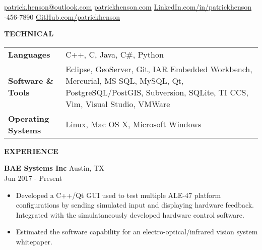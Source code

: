 \documentclass[10pt]{article}
\newcommand{\verticalspace}{\vspace{2.0mm}}
\newcommand{\horizontalrule}{\noindent\hrulefill}
\newcommand{\heading}{\noindent\Large\bf} %
\newcommand{\headingspace}{\vspace{3.5mm}}
\begin{document}
\renewcommand\familydefault{\sfdefault}



\hfill

\vspace{-2mm}
\horizontalrule

\noindent 
\href{mailto:fullname@email.com}{patrick.henson@outlook.com}
\hfill
\href{https://patrickhenson.com}{patrickhenson.com}
\hfill
\href{linkedin.com/in/patrickhenson}{LinkedIn.com/in/patrickhenson}
\\
-456-7890
\hfill
\href{https://github.com/PatrickHenson}{GitHub.com/patrickhenson}

\headingspace
{\heading TECHNICAL}

\verticalspace

\begin{tabular}{@{} p{.2\linewidth} p{.75\linewidth}}

{\bf Languages} & C++, C, Java, C\#, Python \\

{\bf Software \& Tools} & Eclipse, GeoServer, Git, IAR Embedded Workbench, Mercurial, MS SQL, MySQL, Qt, PostgreSQL/PostGIS, Subversion, SQLite, TI CCS, Vim, Visual Studio, VMWare \\

{\bf Operating Systems} & Linux, Mac OS X, Microsoft Windows

\end{tabular}

{\heading EXPERIENCE}

\verticalspace

{\bf BAE Systems Inc} \hfill Austin, TX \\
 \hfill Jun 2017 - Present
\begin{itemize}
\item Developed a C++/Qt GUI used to test multiple ALE-47 platform configurations by sending simulated input and displaying hardware feedback.  Integrated with the simulataneously developed hardware control software.
\item Estimated the software capability for an electro-optical/infrared vision system whitepaper.
\end{itemize}
\end{document}
